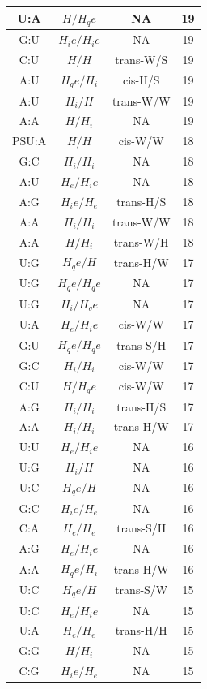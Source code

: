 \begin{center}
\begin{longtable}{c|c|c|c}
U:A & $H/H_qe$ & NA & 19 \\  \hline
G:U & $H_ie/H_ie$ & NA & 19 \\  \hline
C:U & $H/H$ & trans-W/S & 19 \\  \hline
A:U & $H_qe/H_i$ & cis-H/S & 19 \\  \hline
A:U & $H_i/H$ & trans-W/W & 19 \\  \hline
A:A & $H/H_i$ & NA & 19 \\  \hline
PSU:A & $H/H$ & cis-W/W & 18 \\  \hline
G:C & $H_i/H_i$ & NA & 18 \\  \hline
A:U & $H_e/H_ie$ & NA & 18 \\  \hline
A:G & $H_ie/H_e$ & trans-H/S & 18 \\  \hline
A:A & $H_i/H_i$ & trans-W/W & 18 \\  \hline
A:A & $H/H_i$ & trans-W/H & 18 \\  \hline
U:G & $H_qe/H$ & trans-H/W & 17 \\  \hline
U:G & $H_qe/H_qe$ & NA & 17 \\  \hline
U:G & $H_i/H_qe$ & NA & 17 \\  \hline
U:A & $H_e/H_ie$ & cis-W/W & 17 \\  \hline
G:U & $H_qe/H_qe$ & trans-S/H & 17 \\  \hline
G:C & $H_i/H_i$ & cis-W/W & 17 \\  \hline
C:U & $H/H_qe$ & cis-W/W & 17 \\  \hline
A:G & $H_i/H_i$ & trans-H/S & 17 \\  \hline
A:A & $H_i/H_i$ & trans-H/W & 17 \\  \hline
U:U & $H_e/H_ie$ & NA & 16 \\  \hline
U:G & $H_i/H$ & NA & 16 \\  \hline
U:C & $H_qe/H$ & NA & 16 \\  \hline
G:C & $H_ie/H_e$ & NA & 16 \\  \hline
C:A & $H_e/H_e$ & trans-S/H & 16 \\  \hline
A:G & $H_e/H_ie$ & NA & 16 \\  \hline
A:A & $H_qe/H_i$ & trans-H/W & 16 \\  \hline
U:C & $H_qe/H$ & trans-S/W & 15 \\  \hline
U:C & $H_e/H_ie$ & NA & 15 \\  \hline
U:A & $H_e/H_e$ & trans-H/H & 15 \\  \hline
G:G & $H/H_i$ & NA & 15 \\  \hline
C:G & $H_ie/H_e$ & NA & 15 \\  \hline

\end{longtable}
\end{center}

